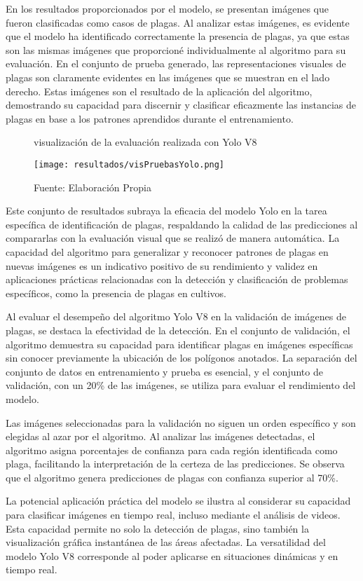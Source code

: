 En los resultados proporcionados por el modelo, se presentan imágenes que fueron clasificadas como casos de plagas. Al analizar estas imágenes, es evidente que el modelo ha identificado correctamente la presencia de plagas, ya que estas son las mismas imágenes que proporcioné individualmente al algoritmo para su evaluación. En el conjunto de prueba generado, las representaciones visuales de plagas son claramente evidentes en las imágenes que se muestran en el lado derecho. Estas imágenes son el resultado de la aplicación del algoritmo, demostrando su capacidad para discernir y clasificar eficazmente las instancias de plagas en base a los patrones aprendidos durante el entrenamiento.

\newpage

\begin{figure}[h]
\centering
\caption{visualización de la evaluación realizada con Yolo V8}
\texttt{[image: resultados/visPruebasYolo.png]}
\caption*{\footnotesize Fuente: Elaboración Propia}
\label{fig:figuraVisPruebasYolo}
\end{figure}

Este conjunto de resultados subraya la eficacia del modelo Yolo en la tarea específica de identificación de plagas, respaldando la calidad de las predicciones al compararlas con la evaluación visual que se realizó de manera automática. La capacidad del algoritmo para generalizar y reconocer patrones de plagas en nuevas imágenes es un indicativo positivo de su rendimiento y validez en aplicaciones prácticas relacionadas con la detección y clasificación de problemas específicos, como la presencia de plagas en cultivos.

Al evaluar el desempeño del algoritmo Yolo V8 en la validación de imágenes de plagas, se destaca la efectividad de la detección. En el conjunto de validación, el algoritmo demuestra su capacidad para identificar plagas en imágenes específicas sin conocer previamente la ubicación de los polígonos anotados. La separación del conjunto de datos en entrenamiento y prueba es esencial, y el conjunto de validación, con un 20\% de las imágenes, se utiliza para evaluar el rendimiento del modelo.

\newpage

Las imágenes seleccionadas para la validación no siguen un orden específico y son elegidas al azar por el algoritmo. Al analizar las imágenes detectadas, el algoritmo asigna porcentajes de confianza para cada región identificada como plaga, facilitando la interpretación de la certeza de las predicciones. Se observa que el algoritmo genera predicciones de plagas con confianza superior al 70\%.

La potencial aplicación práctica del modelo se ilustra al considerar su capacidad para clasificar imágenes en tiempo real, incluso mediante el análisis de videos. Esta capacidad permite no solo la detección de plagas, sino también la visualización gráfica instantánea de las áreas afectadas. La versatilidad del modelo Yolo V8 corresponde al poder aplicarse en situaciones dinámicas y en tiempo real.